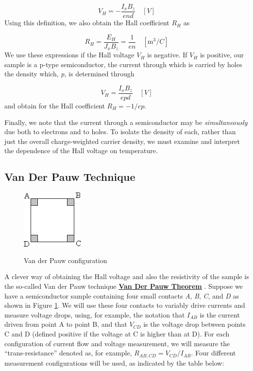 \documentclass{../lab}
\begin{document}
\begin{equation}
    V_H=-\frac{I_xB_z}{end} \quad [V]
\end{equation}
Using this definition, we also obtain the Hall coefficient $ R_H $ as

\begin{equation}
    R_H=\frac{E_H}{J_xB_z}=\frac{1}{en} \quad [\text{m}^3/C]
\end{equation}
We use these expressions if the Hall voltage $ V_H $ is negative. If $ V_H $ is positive, our sample is a p-type semiconductor, the current through which is carried by holes the density which, \emph{p}, is determined through

\begin{equation}
    V_H=\frac{I_xB_z}{epd} \quad [V]
\end{equation}
and obtain for the Hall coefficient $R_H = -1/ep$.

Finally, we note that the current through a semiconductor may be \emph{simultaneously} due both to electrons and to holes. To isolate the density of each, rather than just the overall charge-weighted carrier density, we must examine and interpret the dependence of the Hall voltage on temperature.

\subsection{Van Der Pauw Technique}

\begin{figure}[h]
    \centering
    \href{http://experimentationlab.berkeley.edu/sites/default/files/images/SHEimage052.gif}{\includegraphics[width=0.3\linewidth]{images/SHEimage052.png}}
    \caption{Van der Pauw configuration}
    \label{fig:VanDerPauwConfiguration}
\end{figure}

A clever way of obtaining the Hall voltage and also the resistivity of the sample is the so-called Van der Pauw technique \href{http://experimentationlab.berkeley.edu/node/105}{\textbf{Van Der Pauw Theorem}} . Suppose we have a semiconductor sample containing four small contacts \emph{A}, \emph{B}, \emph{C}, and \emph{D} as shown in Figure \ref{fig:VanDerPauwConfiguration}. We will use these four contacts to variably drive currents and measure voltage drops, using, for example, the notation that $I_{AB}$ is the current driven from point A to point B, and that $V_{CD}$ is the voltage drop between points C and D (defined positive if the voltage at C is higher than at D). For each configuration of current flow and voltage measurement, we will measure the ``trans-resistance'' denoted as, for example, $R_{AB,CD} = V_{CD} / I_{AB}$. Four different measurement configurations will be used, as indicated by the table below:
\end{document}
